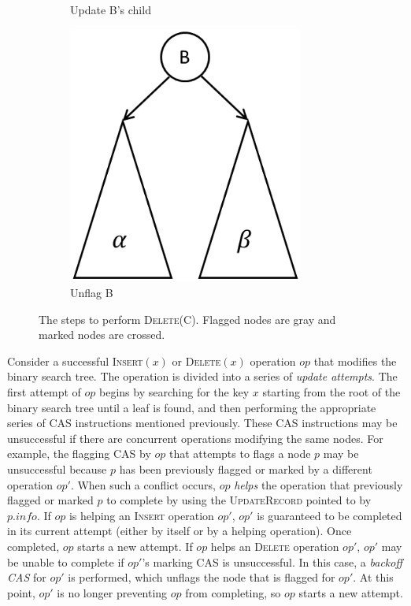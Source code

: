 \documentclass[letterpaper,twocolumn]{article}
\newcommand{\info}{\mathit{info}}
\begin{document}
\begin{figure}[!bt]
\begin{subfigure}[b]{0.2\textwidth}
		\caption{Update B's child}
	\end{subfigure}
	\qquad
	\begin{subfigure}[b]{0.2\textwidth}\centering
		\includegraphics[width=0.85\textwidth]{bst_del_5.png} 
		\caption{Unflag B}
	\end{subfigure}
	\caption{The steps to perform \textsc{Delete}(C). Flagged nodes are gray and marked nodes are crossed.}\label{fig_bst_delete}
\end{figure}

Consider a successful \textsc{Insert}$(x)$ or \textsc{Delete}$(x)$ operation $op$ that modifies the binary search tree. The operation is divided into a series of \textit{update attempts}. The first attempt of $op$ begins by searching for the key $x$ starting from the root of the binary search tree until a leaf is found, and then performing the appropriate series of CAS instructions mentioned previously. These CAS instructions may be unsuccessful if there are concurrent operations modifying the same nodes. For example, the flagging CAS by $op$ that attempts to flags a node $p$ may be unsuccessful because $p$ has been previously flagged or marked by a different operation $op'$. When such a conflict occurs, $op$ \textit{helps} the operation that previously flagged or marked $p$ to complete by using the \textsc{UpdateRecord} pointed to by $p.\info$. If $op$ is helping an \textsc{Insert} operation $op'$, $op'$ is guaranteed to be completed in its current attempt (either by itself or by a helping operation). Once completed, $op$ starts a new attempt. If $op$ helps an \textsc{Delete} operation $op'$, $op'$ may be unable to complete if $op'$'s marking CAS is unsuccessful. In this case, a \textit{backoff CAS} for $op'$ is performed, which unflags the node that is flagged for $op'$. At this point, $op'$ is no longer preventing $op$ from completing, so $op$ starts a new attempt.
\end{document}
